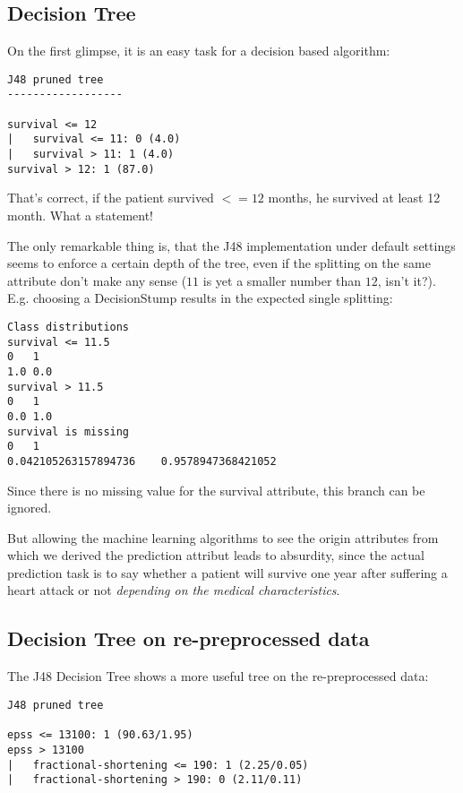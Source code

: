 \documentclass[paper=a4, fontsize=11pt]{scrartcl} %
\numberwithin{equation}{section} %
\numberwithin{figure}{section} %
\numberwithin{table}{section} %
\begin{document}


\subsection{Decision Tree}
On the first glimpse, it is an easy task for a decision based algorithm:

\begin{lstlisting}
J48 pruned tree
------------------

survival <= 12
|   survival <= 11: 0 (4.0)
|   survival > 11: 1 (4.0)
survival > 12: 1 (87.0)
\end{lstlisting}

That's correct, if the patient survived $ <= 12 $ months, he survived at least 12 month. What a statement! 

The only remarkable thing is, that the J48 implementation under default settings seems to enforce a certain depth of the tree, even if the splitting on the same attribute don't make any sense ($ 11 $ is yet a smaller number than $ 12 $, isn't it?). E.g. choosing a DecisionStump results in the expected single splitting: 
\begin{lstlisting}
Class distributions
survival <= 11.5
0   1   
1.0 0.0 
survival > 11.5
0   1   
0.0 1.0 
survival is missing
0   1   
0.042105263157894736    0.9578947368421052
\end{lstlisting}
Since there is no missing value for the survival attribute, this branch can be ignored.

But allowing the machine learning algorithms to see the origin attributes from which we derived the prediction attribut leads to absurdity, since the actual prediction task is to say whether a patient will survive one year after suffering a heart attack or not \emph{depending on the medical characteristics}.


\subsection{Decision Tree on re-preprocessed data}

The J48 Decision Tree shows a more useful tree on the re-preprocessed data:
\begin{lstlisting}
J48 pruned tree

epss <= 13100: 1 (90.63/1.95)
epss > 13100
|   fractional-shortening <= 190: 1 (2.25/0.05)
|   fractional-shortening > 190: 0 (2.11/0.11)
\end{lstlisting}
\end{document}
